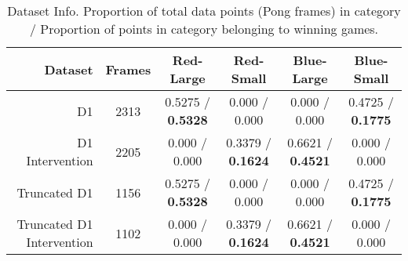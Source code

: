 \documentclass{article}
\begin{document}


\begin{table*} %
\centering
\begin{tabular}{r | c | c | c | c | c}
 Dataset & Frames & Red-Large & Red-Small & Blue-Large & Blue-Small \\
 \hline
 D1 & 2313 & 0.5275 / \textbf{0.5328} & 0.000 / 0.000 & 0.000 / 0.000 & 0.4725 / \textbf{0.1775} \\
 D1 Intervention & 2205 & 0.000 / 0.000 & 0.3379 / \textbf{0.1624} & 0.6621 / \textbf{0.4521} & 0.000 / 0.000 \\
 Truncated D1 & 1156 & 0.5275 / \textbf{0.5328} & 0.000 / 0.000 & 0.000 / 0.000 & 0.4725 / \textbf{0.1775} \\ 
 Truncated D1 Intervention & 1102 & 0.000 / 0.000 & 0.3379 / \textbf{0.1624} & 0.6621 / \textbf{0.4521} & 0.000 / 0.000 \\
\end{tabular}
\caption{Dataset Info. Proportion of total data points (Pong frames) in category / Proportion of points in category belonging to winning games.}
\label{tab:dataset_proportions}
\end{table*}
\end{document}
